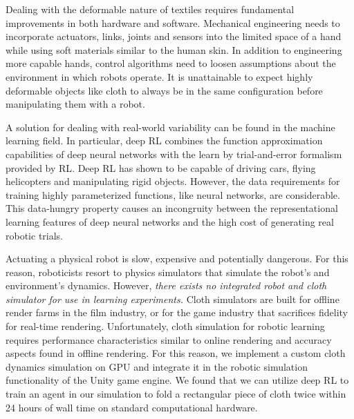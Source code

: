 \documentclass[\home/main.tex]{subfiles}
\begin{document}
Dealing with the deformable nature of textiles requires fundamental improvements in both hardware and software. Mechanical engineering needs to incorporate actuators, links, joints and sensors into the limited space of a hand while using soft materials similar to the human skin. In addition to engineering more capable hands, control algorithms need to loosen assumptions about the environment in which robots operate. It is unattainable to expect highly deformable objects like cloth to always be in the same configuration before manipulating them with a robot.

A solution for dealing with real-world variability can be found in the machine learning field. In particular, deep \gls{RL} combines the function approximation capabilities of deep neural networks with the learn by trial-and-error formalism provided by \gls{RL}. Deep \gls{RL} has shown to be capable of driving cars, flying helicopters and manipulating rigid objects. However, the data requirements for training highly parameterized functions, like neural networks, are considerable. This data-hungry property causes an incongruity between the representational learning features of deep neural networks and the high cost of generating real robotic trials.



Actuating a physical robot is slow, expensive and potentially dangerous. For this reason, roboticists resort to physics simulators that simulate the robot's and environment's dynamics. However, \emph{there exists no integrated robot and cloth simulator for use in learning experiments.}
Cloth simulators are built for offline render farms in the film industry, or for the game industry that sacrifices fidelity for real-time rendering. Unfortunately, cloth simulation for robotic learning requires performance characteristics similar to online rendering and accuracy aspects found in offline rendering. For this reason, we implement a custom cloth dynamics simulation on GPU and integrate it in the robotic simulation functionality of the Unity game engine.
We found that we can utilize deep \gls{RL} to train an agent in our simulation to fold a rectangular piece of cloth twice within \qty{24}{} hours of wall time on standard computational hardware. 
\end{document}
